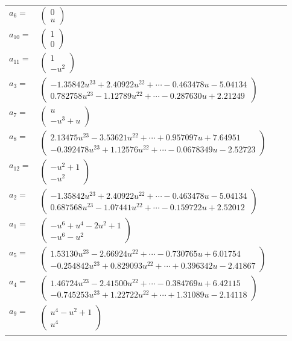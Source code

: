 \documentclass[1p]{elsarticle_modified}
\theoremstyle{definition}
\begin{document}
\begin{tabular}{m{7pt} m{180pt} m{7pt} m{180pt} }
\flushright $a_{6}=$&$\begin{pmatrix}0\\u\end{pmatrix}$ \\
\flushright $a_{10}=$&$\begin{pmatrix}1\\0\end{pmatrix}$ \\
\flushright $a_{11}=$&$\begin{pmatrix}1\\- u^2\end{pmatrix}$ \\
\flushright $a_{3}=$&$\begin{pmatrix}-1.35842 u^{23}+2.40922 u^{22}+\cdots-0.463478 u-5.04134\\0.782758 u^{23}-1.12789 u^{22}+\cdots-0.287630 u+2.21249\end{pmatrix}$ \\
\flushright $a_{7}=$&$\begin{pmatrix}u\\- u^3+u\end{pmatrix}$ \\
\flushright $a_{8}=$&$\begin{pmatrix}2.13475 u^{23}-3.53621 u^{22}+\cdots+0.957097 u+7.64951\\-0.392478 u^{23}+1.12576 u^{22}+\cdots-0.0678349 u-2.52723\end{pmatrix}$ \\
\flushright $a_{12}=$&$\begin{pmatrix}- u^2+1\\- u^2\end{pmatrix}$ \\
\flushright $a_{2}=$&$\begin{pmatrix}-1.35842 u^{23}+2.40922 u^{22}+\cdots-0.463478 u-5.04134\\0.687568 u^{23}-1.07441 u^{22}+\cdots-0.159722 u+2.52012\end{pmatrix}$ \\
\flushright $a_{1}=$&$\begin{pmatrix}- u^6+u^4-2 u^2+1\\- u^6- u^2\end{pmatrix}$ \\
\flushright $a_{5}=$&$\begin{pmatrix}1.53130 u^{23}-2.66924 u^{22}+\cdots-0.730765 u+6.01754\\-0.254842 u^{23}+0.829093 u^{22}+\cdots+0.396342 u-2.41867\end{pmatrix}$ \\
\flushright $a_{4}=$&$\begin{pmatrix}1.46724 u^{23}-2.41500 u^{22}+\cdots-0.384769 u+6.42115\\-0.745253 u^{23}+1.22722 u^{22}+\cdots+1.31089 u-2.14118\end{pmatrix}$ \\
\flushright $a_{9}=$&$\begin{pmatrix}u^4- u^2+1\\u^4\end{pmatrix}$\\&\end{tabular}
\end{document}
